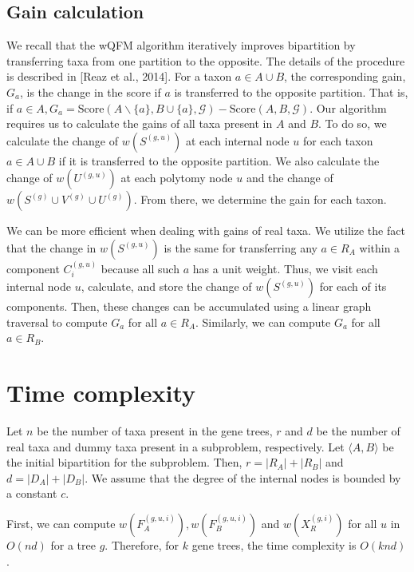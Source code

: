 \documentclass{article}
\begin{document}
\subsection{Gain calculation}

We recall that the wQFM algorithm iteratively improves bipartition by transferring taxa from one partition to the opposite. The details of the procedure is described in [Reaz et al., 2014]. For a taxon $a \in A \cup B$, the corresponding gain, $G_a$, is the change in the score if $a$ is transferred to the opposite partition. That is, if $a \in A, G_a = \text{Score}(A \backslash \{a\}, B \cup \{a\}, \mathcal{G}) - \text{Score}(A, B, \mathcal{G})$. Our algorithm requires us to calculate the gains of all taxa present in $A$ and $B$. To do so, we calculate the change of $w\left(S^{(g, u)}\right)$ at each internal node $u$ for each taxon $a \in A \cup B$ if it is transferred to the opposite partition. We also calculate the change of $w\left(U^{(g, u)}\right)$ at each polytomy node $u$ and the change of $w\left(S^{(g)} \cup V^{(g)} \cup U^{(g)}\right)$. From there, we determine the gain for each taxon.

We can be more efficient when dealing with gains of real taxa. We utilize the fact that the change in $w\left(S^{(g, u)}\right)$ is the same for transferring any $a \in R_A$ within a component $C_i^{(g, u)}$ because all such $a$ has a unit weight. Thus, we visit each internal node $u$, calculate, and store the change of $w\left(S^{(g, u)}\right)$ for each of its components. Then, these changes can be accumulated using a linear graph traversal to compute $G_a$ for all $a \in R_A$. Similarly, we can compute $G_a$ for all $a \in R_B$.

\section{Time complexity}

Let $n$ be the number of taxa present in the gene trees, $r$ and $d$ be the number of real taxa and dummy taxa present in a subproblem, respectively. Let $\langle A, B \rangle$ be the initial bipartition for the subproblem. Then, $r = \left| R_A \right| + \left| R_B \right|$ and $d = \left| D_A \right| + \left| D_B \right|$. We assume that the degree of the internal nodes is bounded by a constant $c$.

First, we can compute $w\left(F_A^{(g, u, i)}\right), w\left(F_B^{(g, u, i)}\right)$ and $w\left(X_R^{(g, i)}\right)$ for all $u$ in $O(n d)$ for a tree $g$. Therefore, for $k$ gene trees, the time complexity is $O(k n d)$.
\end{document}
